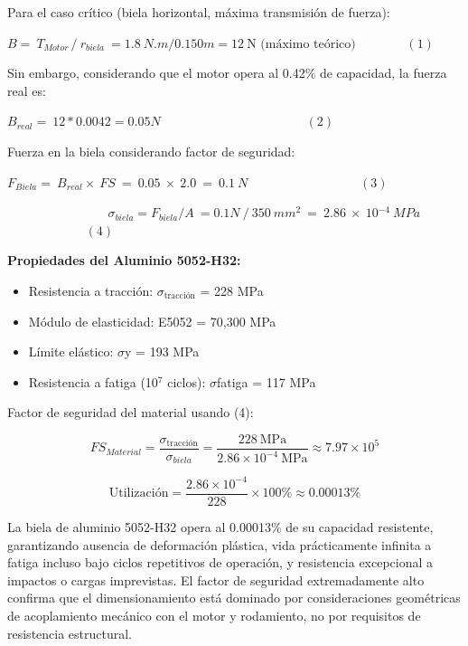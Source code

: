 \documentclass[12pt,a4paper,oneside]{report}
\begin{document}
Para el caso crítico (biela horizontal, máxima transmisión de fuerza):

\(B = \ T_{Motor\ }/\ r_{biela}\  = 1.8\ N.m/0.150m = 12~\text{N (máximo teórico)}\ \ \ \ \ \ \ \ \ \ \ \ \ \ \ \ \ \ (1)\ \ \)

Sin embargo, considerando que el motor opera al 0.42\% de capacidad, la fuerza real es:

\(B_{real} = \ 12*0.0042 = 0.05N\ \ \ \ \ \ \ \ \ \ \ \ \ \ \ \ \ \ \ \ \ \ \ \ \ \ \ \ \ \ \ \ \ \ \ \ \ \ \ \ \ \ \ \ \ \ \ \ \ \ \ \ (2)\ \ \)

Fuerza en la biela considerando factor de seguridad:

\(F_{Biela} = \ B_{real} \times \ FS\  = \ 0.05\  \times \ 2.0\  = \ 0.1\ N\ \ \ \ \ \ \ \ \ \ \ \ \ \ \ \ \ \ \ \ \ \ \ \ \ \ \ \ \ \ \ \ \ \ \ \ \ \ \ \ (3)\ \ \)

\({\ \ \ \ \ \ \ \ \ \ \ \ \ \ \ \ \ \ \ \ \ \ \ \ \ \ \ \ \ \ \ \ \ \ \ \ \sigma}_{biela} = F_{biela}/A\  = 0.1N\ /\ 350\ mm^{2}\  = \ 2.86\  \times \ 10\ensuremath{^{-4}}\ MPa\)\(\ \ \ \ \ \ \ \ \ \ \ \ \ \ \ \ \ \ \ \ \ \ \ \ \ \ \ \ (4)\)

\textbf{Propiedades del Aluminio 5052-H32:}

\begin{itemize}
\item
  Resistencia a tracción: \(\sigma_{\text{tracción}}\) = 228 MPa
\item
  Módulo de elasticidad: E5052 = 70,300 MPa
\item
  Límite elástico: \ensuremath{\sigma}y = 193 MPa
\item
  Resistencia a fatiga (10\ensuremath{^{7}} ciclos): \ensuremath{\sigma}fatiga = 117 MPa
\end{itemize}

Factor de seguridad del material usando (4):

\begin{equation*}
FS_{Material} = \frac{\sigma_{\text{tracción}}}{\sigma_{biela}} = \frac{228~\text{MPa}}{2.86 \times 10^{-4}~\text{MPa}} \approx 7.97\times 10^{5}
\end{equation*}

\begin{equation*}
\text{Utilización} = \frac{2.86 \times 10^{-4}}{228} \times 100\% \approx 0.00013\%
\end{equation*}

La biela de aluminio 5052-H32 opera al 0.00013\% de su capacidad resistente, garantizando ausencia de deformación plástica, vida prácticamente infinita a fatiga incluso bajo ciclos repetitivos de operación, y resistencia excepcional a impactos o cargas imprevistas. El factor de seguridad extremadamente alto confirma que el dimensionamiento está dominado por consideraciones geométricas de acoplamiento mecánico con el motor y rodamiento, no por requisitos de resistencia estructural.
\end{document}
